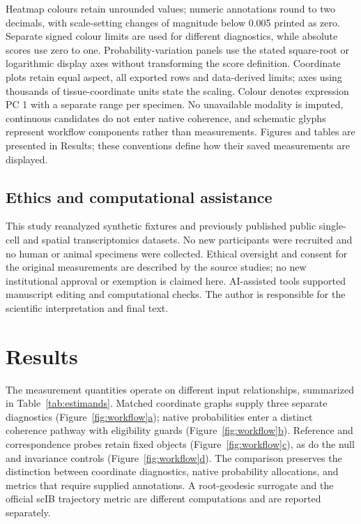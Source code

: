 \documentclass[11pt]{article}
\newcommand{\figpanel}[2]{Figure~\hyperref[#1]{\ref*{#1}#2}}
\begin{document}
Heatmap colours retain unrounded values; numeric annotations round to two decimals, with scale-setting changes of magnitude below 0.005 printed as zero. Separate signed colour limits are used for different diagnostics, while absolute scores use zero to one. Probability-variation panels use the stated square-root or logarithmic display axes without transforming the score definition. Coordinate plots retain equal aspect, all exported rows and data-derived limits; axes using thousands of tissue-coordinate units state the scaling. Colour denotes expression PC 1 with a separate range per specimen. No unavailable modality is imputed, continuous candidates do not enter native coherence, and schematic glyphs represent workflow components rather than measurements. Figures and tables are presented in Results; these conventions define how their saved measurements are displayed.



\subsection{Ethics and computational assistance}
This study reanalyzed synthetic fixtures and previously published public single-cell and spatial transcriptomics datasets. No new participants were recruited and no human or animal specimens were collected. Ethical oversight and consent for the original measurements are described by the source studies; no new institutional approval or exemption is claimed here.
AI-assisted tools supported manuscript editing and computational checks. The author is responsible for the scientific interpretation and final text.

\section{Results}

The measurement quantities operate on different input relationships, summarized in Table~\ref{tab:estimands}. Matched coordinate graphs supply three separate diagnostics (\figpanel{fig:workflow}{a}); native probabilities enter a distinct coherence pathway with eligibility guards (\figpanel{fig:workflow}{b}). Reference and correspondence probes retain fixed objects (\figpanel{fig:workflow}{c}), as do the null and invariance controls (\figpanel{fig:workflow}{d}). The comparison preserves the distinction between coordinate diagnostics, native probability allocations, and metrics that require supplied annotations. A root-geodesic surrogate and the official scIB trajectory metric are different computations and are reported separately.
\end{document}
